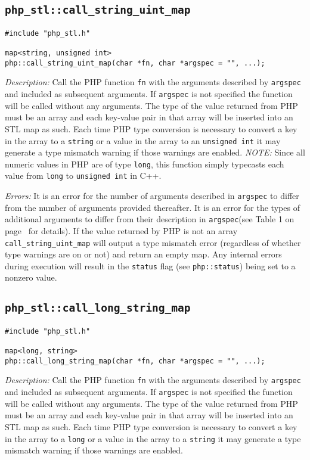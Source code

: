 \documentclass[11pt,titlepage]{article}
\begin{document}
\subsection{\texttt{php\_stl::call\_string\_uint\_map}}

\begin{verbatim}
#include "php_stl.h"

map<string, unsigned int> 
php::call_string_uint_map(char *fn, char *argspec = "", ...);
\end{verbatim}

\emph{Description:} Call the PHP function \verb|fn| with the arguments described by \verb|argspec| and included as subsequent arguments. If \verb|argspec| is not specified the function will be called without any arguments. The type of the value returned from PHP must be an array and each key-value pair in that array will be inserted into an STL map as such. Each time PHP type conversion is necessary to convert a key in the array to a \verb|string| or a value in the array to an \verb|unsigned int| it may generate a type mismatch warning if those warnings are enabled. \emph{NOTE:} Since all numeric values in PHP are of type \verb|long|, this function simply typecasts each value from \verb|long| to \verb|unsigned int| in C++.

\emph{Errors:} It is an error for the number of arguments described in \verb|argspec| to differ from the number of arguments provided thereafter. It is an error for the types of additional arguments to differ from their description in \verb|argspec|(see Table 1 on page~\pageref{Table1} for details). If the value returned by PHP is not an array \verb|call_string_uint_map| will output a type mismatch error (regardless of whether type warnings are on or not) and return an empty map. Any internal errors during execution will result in the \verb|status| flag (see \verb|php::status|) being set to a nonzero value.


\subsection{\texttt{php\_stl::call\_long\_string\_map}}

\begin{verbatim}
#include "php_stl.h"

map<long, string>
php::call_long_string_map(char *fn, char *argspec = "", ...);
\end{verbatim}

\emph{Description:} Call the PHP function \verb|fn| with the arguments described by \verb|argspec| and included as subsequent arguments. If \verb|argspec| is not specified the function will be called without any arguments. The type of the value returned from PHP must be an array and each key-value pair in that array will be inserted into an STL map as such. Each time PHP type conversion is necessary to convert a key in the array to a \verb|long| or a value in the array to a \verb|string| it may generate a type mismatch warning if those warnings are enabled.
\end{document}
